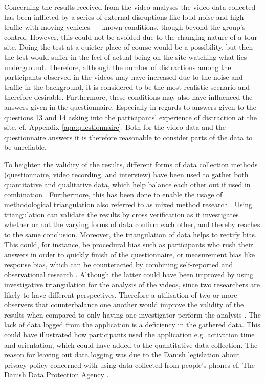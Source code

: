 Concerning the results received from the video analyses the video data collected has been inflicted by a series of external disruptions like loud noise and high traffic with moving vehicles --- known conditions, though beyond the group’s control. However, this could not be avoided due to the changing nature of a tour site. Doing the test at a quieter place of course would be a possibility, but then the test would suffer in the feel of actual being on the site watching what lies underground. Therefore, although the number of distractions among the participants observed in the videos may have increased due to the noise and traffic in the background, it is considered to be the most realistic scenario and therefore desirable. Furthermore, these conditions may also have influenced the answers given in the questionnaire. Especially in regards to answers given to the questions 13 and 14 asking into the participants’ experience of distraction at the site, cf. Appendix \ref{app:questionnaire}.
Both for the video data and the questionnaire answers it is therefore reasonable to consider parts of the data to be unreliable. 

To heighten the validity of the results, different forms of data collection methods (questionnaire, video recording, and interview) have been used to gather both quantitative and qualitative data, which help balance each other out if used in combination . Furthermore, this has been done to enable the usage of methodological triangulation also referred to as mixed method research \cite{Kennedy}. Using triangulation can validate the results by cross verification as it investigates whether or not the varying forms of data confirm each other, and thereby reaches to the same conclusion. Moreover, the triangulation of data helps to rectify bias. This could, for instance, be procedural bias such as participants who rush their answers in order to quickly finish of the questionnaire, or measurement bias like response bias, which can be counteracted by combining self-reported and observational research \cite{Kennedy}. Although the latter could have been improved by using investigative triangulation for the analysis of the videos, since two researchers are likely to have different perspectives. Therefore a utilisation of two or more observers that counterbalance one another would improve the validity of the results when compared to only having one investigator perform the analysis \cite{Kennedy}. The lack of data logged from the application is a deficiency in the gathered data. This could have illustrated how participants used the application e.g. activation time and orientation, which could have added to the quantitative data collection. The reason for leaving out data logging was due to the Danish legislation about privacy policy concerned with using data collected from people’s phones cf. The Danish Data Protection Agency \cite{Datatilsynet}.

